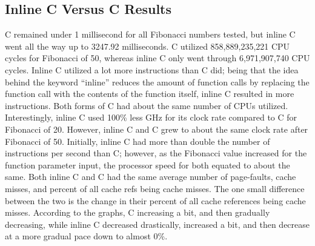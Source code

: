 \documentclass{sig-alternate}
\begin{document}
\subsection{Inline C Versus C Results}
C remained under 1 millisecond for all Fibonacci numbers tested, but inline C went all the way up to 3247.92 milliseconds. C utilized 858,889,235,221 CPU cycles for Fibonacci of 50, whereas inline C only went through 6,971,907,740 CPU cycles. Inline C utilized a lot more instructions than C did; being that the idea behind the keyword “inline” reduces the amount of function calls by replacing the function call with the contents of the function itself, inline C resulted in more instructions. Both forms of C had about the same number of CPUs utilized. Interestingly, inline C used 100\% less GHz for its clock rate compared to C for Fibonacci of 20. However, inline C and C grew to about the same clock rate after Fibonacci of 50. Initially, inline C had more than double the number of instructions per second than C; however, as the Fibonacci value increased for the function parameter input, the processor speed for both equated to about the same. Both inline C and C had the same average number of page-faults, cache misses, and percent of all cache refs being cache misses. The one small difference between the two is the change in their percent of all cache references being cache misses. According to the graphs, C increasing a bit, and then gradually decreasing, while inline C decreased drastically, increased a bit, and then decrease at a more gradual pace down to almost 0\%.
\end{document}
